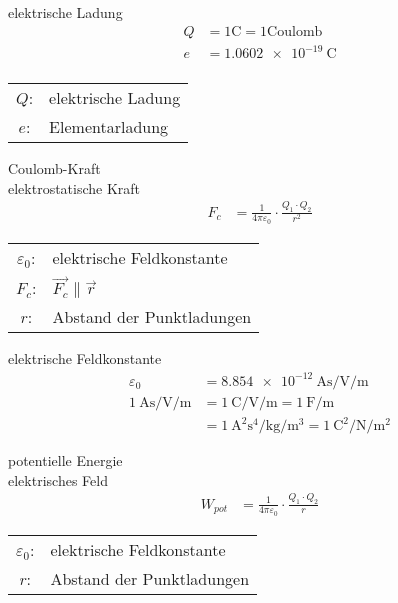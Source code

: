 
\begin{karte}{elektrische Ladung}
    \begin{align*}
        Q &= 1 \si{\coulomb} = 1 \text{Coulomb} \\
        e &=  \SI{1.0602e-19}{\coulomb} \\
    \end{align*}
    \begin{tabular}[t]{cl}
        \( Q \): & elektrische Ladung \\
        \( e \): & Elementarladung\\
    \end{tabular}
\end{karte}

\begin{karte}{Coulomb-Kraft\\elektrostatische Kraft}
    \begin{align*}
        F_c &= \frac{1}{4 \pi \varepsilon_0 } \cdot \frac{Q_1 \cdot Q_2 }{r^2} 
    \end{align*}
    \begin{tabular}[t]{cl}
        \( \varepsilon_0 \): & elektrische Feldkonstante \\
        \( F_c \): & \( \vec{F_c} \| \vec r \) \\
        \( r \): & Abstand der Punktladungen
    \end{tabular}
\end{karte}

\begin{karte}{elektrische Feldkonstante}
    \begin{align*}
        \varepsilon_0 &= \SI{8,854e-12}{\ampere\second\per\volt\per\meter} \\
        \SI{1}{\ampere\second\per\volt\per\meter} &= 
        \SI{1}{\coulomb\per\volt\per\meter} =
        \SI{1}{\farad\per\meter} \\
        &= \SI{1}{\square\ampere\second\tothe{4}\per\kilogram\per\cubic\meter} =
        \SI{1}{\square\coulomb\per\newton\per\square\meter}
    \end{align*}
\end{karte}

\begin{karte}{potentielle Energie\\elektrisches Feld}
    \begin{align*}
        W_{pot} &= \frac{1}{4 \pi \varepsilon_0 } \cdot \frac{Q_1 \cdot Q_2 }{r} 
    \end{align*}
    \begin{tabular}[t]{cl}
        \( \varepsilon_0 \): & elektrische Feldkonstante \\
        \( r \): & Abstand der Punktladungen
    \end{tabular}
\end{karte}

